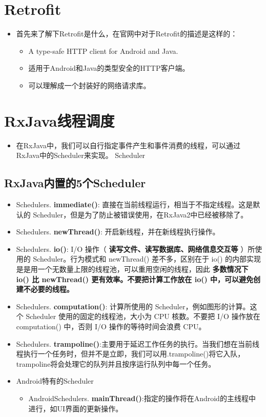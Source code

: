 \documentclass[9pt, b5paper]{article}
\begin{document}
\section{Retrofit}
\label{sec-5}
\begin{itemize}
\item 首先来了解下Retrofit是什么，在官网中对于Retrofit的描述是这样的：
\begin{itemize}
\item A type-safe HTTP client for Android and Java.
\item 适用于Android和Java的类型安全的HTTP客户端。
\item 可以理解成一个封装好的网络请求库。
\end{itemize}
\end{itemize}
\section{RxJava线程调度}
\label{sec-6}
\begin{itemize}
\item 在RxJava中，我们可以自行指定事件产生和事件消费的线程，可以通过RxJava中的Scheduler来实现。 Scheduler
\end{itemize}
\subsection{RxJava内置的5个Scheduler}
\label{sec-6-1}
\begin{itemize}
\item Schedulers. \textbf{immediate()}: 直接在当前线程运行，相当于不指定线程。这是默认的 Scheduler，但是为了防止被错误使用，在RxJava2中已经被移除了。
\item Schedulers. \textbf{newThread()}: 开启新线程，并在新线程执行操作。
\item Schedulers. \textbf{io()}: I/O 操作（ \textbf{读写文件、读写数据库、网络信息交互等} ）所使用的 Scheduler。行为模式和 newThread() 差不多，区别在于 io() 的内部实现是是用一个无数量上限的线程池，可以重用空闲的线程，因此 \textbf{多数情况下 io() 比 newThread() 更有效率。不要把计算工作放在 io() 中，可以避免创建不必要的线程。}
\item Schedulers. \textbf{computation()}: 计算所使用的 Scheduler，例如图形的计算。这个 Scheduler 使用的固定的线程池，大小为 CPU 核数。不要把 I/O 操作放在 computation() 中，否则 I/O 操作的等待时间会浪费 CPU。
\item Schedulers. \textbf{trampoline()}:主要用于延迟工作任务的执行。当我们想在当前线程执行一个任务时，但并不是立即，我们可以用.trampoline()将它入队，trampoline将会处理它的队列并且按序运行队列中每一个任务。
\item Android特有的Scheduler
\begin{itemize}
\item AndroidSchedulers. \textbf{mainThread()}:指定的操作将在Android的主线程中进行，如UI界面的更新操作。
\end{itemize}
\end{itemize}
\end{document}
